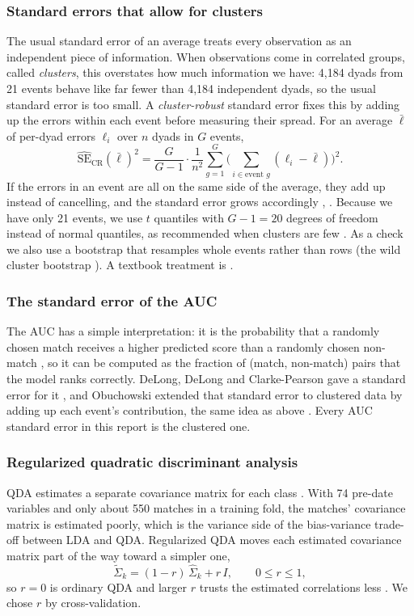\subsubsection{Standard errors that allow for clusters}
The usual standard error of an average treats every observation as an independent piece of information. When
observations come in correlated groups, called \emph{clusters}, this overstates how much information we have: 4,184
dyads from 21 events behave like far fewer than 4,184 independent dyads, so the usual standard error is too small.
A \emph{cluster-robust} standard error fixes this by adding up the errors within each event before measuring their
spread. For an average $\bar\ell$ of per-dyad errors $\ell_i$ over $n$ dyads in $G$ events,
\[
\widehat{\mathrm{SE}}_{\mathrm{CR}}(\bar\ell)^2=\frac{G}{G-1}\cdot\frac{1}{n^2}\sum_{g=1}^{G}\Big(\sum_{i\in\text{event }g}(\ell_i-\bar\ell)\Big)^2 .
\]
If the errors in an event are all on the same side of the average, they add up instead of cancelling, and the
standard error grows accordingly \cite{Liang:1986}, \cite[Section II.C]{Cameron:2015}. Because we have only 21 events, we
use $t$ quantiles with $G-1=20$ degrees of freedom instead of normal quantiles, as recommended when clusters are few
\cite[Section VI]{Cameron:2015}. As a check we also use a bootstrap that resamples whole events rather than rows (the
wild cluster bootstrap \cite{Cameron:2008}). A textbook treatment is \cite[Section 24.5, pp.~829--845]{Cameron:2005}.

\subsubsection{The standard error of the AUC}
The AUC \cite[pp.~153--155]{James:2023} has a simple interpretation: it is the probability that a randomly chosen match
receives a higher predicted score than a randomly chosen non-match \cite[pp.~30--31]{Hanley:1982}, so it can be computed as
the fraction of (match, non-match) pairs that the model ranks correctly. DeLong, DeLong and Clarke-Pearson gave a
standard error for it \cite{DeLong:1988}, and Obuchowski extended that standard error to clustered data by adding up each
event's contribution, the same idea as above \cite{Obuchowski:1997}. Every AUC standard error in this report is the
clustered one.

\subsubsection{Regularized quadratic discriminant analysis}
QDA estimates a separate covariance matrix for each class \cite[Section 4.4.3, p.~156]{James:2023}. With 74 pre-date
variables and only about 550 matches in a training fold, the matches' covariance matrix is estimated poorly, which is
the variance side of the bias-variance trade-off between LDA and QDA. Regularized QDA \cite{Friedman:1989} moves each
estimated covariance matrix part of the way toward a simpler one,
\[
\widetilde\Sigma_k=(1-r)\,\hat\Sigma_k+r\,I,\qquad 0\le r\le 1,
\]
so $r=0$ is ordinary QDA and larger $r$ trusts the estimated correlations less \cite[Section 4.3.1, Eq.~(4.14), p.~112]{Hastie:2009}.
We chose $r$ by cross-validation.

